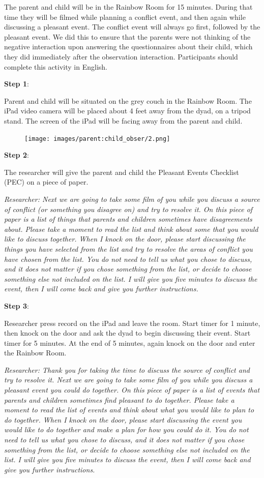 \documentclass[
]{book}
\begin{document}
The parent and child will be in the Rainbow Room for 15 minutes. During that time they will be filmed while planning a conflict event, and then again while discussing a pleasant event. The conflict event will always go first, followed by the pleasant event. We did this to ensure that the parents were not thinking of the negative interaction upon answering the questionnaires about their child, which they did immediately after the observation interaction. Participants should complete this activity in English.

\textbf{Step 1}:

Parent and child will be situated on the grey couch in the Rainbow Room. The iPad video camera will be placed about 4 feet away from the dyad, on a tripod stand. The screen of the iPad will be facing away from the parent and child.

\begin{figure}
\centering
\texttt{[image: images/parent:child\_obser/2.png]}
\caption{}
\end{figure}

\textbf{Step 2}:

The researcher will give the parent and child the Pleasant Events Checklist (PEC) on a piece of paper.

\emph{Researcher: Next we are going to take some film of you while you discuss a source of conflict (or something you disagree on) and try to resolve it. On this piece of paper is a list of things that parents and children sometimes have disagreements about. Please take a moment to read the list and think about some that you would like to discuss together. When I knock on the door, please start discussing the things you have selected from the list and try to resolve the areas of conflict you have chosen from the list. You do not need to tell us what you chose to discuss, and it does not matter if you chose something from the list, or decide to choose something else not included on the list. I will give you five minutes to discuss the event, then I will come back and give you further instructions.}

\textbf{Step 3}:

Researcher press record on the iPad and leave the room. Start timer for 1 minute, then knock on the door and ask the dyad to begin discussing their event. Start timer for 5 minutes. At the end of 5 minutes, again knock on the door and enter the Rainbow Room.

\emph{Researcher: Thank you for taking the time to discuss the source of conflict and try to resolve it. Next we are going to take some film of you while you discuss a pleasant event you could do together. On this piece of paper is a list of events that parents and children sometimes find pleasant to do together. Please take a moment to read the list of events and think about what you would like to plan to do together. When I knock on the door, please start discussing the event you would like to do together and make a plan for how you could do it. You do not need to tell us what you chose to discuss, and it does not matter if you chose something from the list, or decide to choose something else not included on the list. I will give you five minutes to discuss the event, then I will come back and give you further instructions.}
\end{document}
